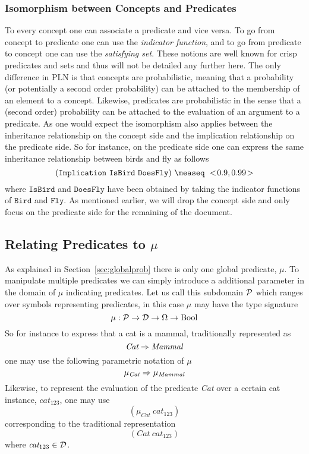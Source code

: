 \documentclass[]{article}
\begin{document}
\subsubsection{Isomorphism between Concepts and Predicates}
To every concept one can associate a predicate and vice versa.  To go
from concept to predicate one can use the \emph{indicator function},
and to go from predicate to concept one can use the \emph{satisfying
set}.  These notions are well known for crisp predicates and sets and
thus will not be detailed any further here.  The only difference in
PLN is that concepts are probabilistic, meaning that a probability (or
potentially a second order probability) can be attached to the
membership of an element to a concept.  Likewise, predicates are
probabilistic in the sense that a (second order) probability can be
attached to the evaluation of an argument to a predicate.  As one
would expect the isomorphism also applies between the inheritance
relationship on the concept side and the implication relationship on
the predicate side.  So for instance, on the predicate side one can
express the same inheritance relationship between birds and fly as
follows
$$(\texttt{Implication}\ \texttt{IsBird}\ \texttt{DoesFly})\ \measeq\ \STV{0.9}{0.99}$$
where $\texttt{IsBird}$ and $\texttt{DoesFly}$ have been obtained by
taking the indicator functions of $\texttt{Bird}$ and $\texttt{Fly}$.
As mentioned earlier, we will drop the concept side and only focus on
the predicate side for the remaining of the document.

\subsection{Relating Predicates to \texorpdfstring{$\mu$}{𝜇}}
As explained in Section~\ref{sec:globalprob} there is only one global
predicate, $\mu$.  To manipulate multiple predicates we can simply
introduce a additional parameter in the domain of $\mu$ indicating
predicates.  Let us call this subdomain $\mathcal{P}$ which ranges over
symbols representing predicates, in this case $\mu$ may have the type
signature
$$\mu : \mathcal{P} \to \mathcal{D} \to \Omega \to \textup{Bool}$$ So for instance
to express that a cat is a mammal, traditionally represented as
$$\textit{Cat} \Rightarrow \textit{Mammal}$$ one may use the following
parametric notation of $\mu$
$$\mu_{\textit{Cat}} \Rightarrow \mu_{\textit{Mammal}}$$ Likewise, to
represent the evaluation of the predicate \textit{Cat} over a certain
cat instance, $\textit{cat}_{123}$, one may use
$$(\mu_{\textit{Cat}}\ \textit{cat}_{123})$$ corresponding to
the traditional representation
$$(\textit{Cat}\ \textit{cat}_{123})$$ where $\textit{cat}_{123} \in
\mathcal{D}$.
\end{document}
